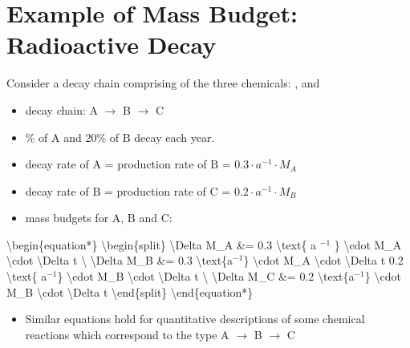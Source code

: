 \documentclass[letterpaper,10pt,english]{jupyterBook}
\begin{document}
\section{Example of Mass Budget: Radioactive Decay}
\label{\detokenize{content/background/03_basic_hydrogeology:example-of-mass-budget-radioactive-decay}}
\sphinxAtStartPar
Consider a decay chain comprising of the three chemicals: ,  and 
\begin{itemize}
\item {} 
\sphinxAtStartPar
decay chain: A \(\rightarrow\) B \(\rightarrow\) C       

\item {} 
\% of \(\text{A}\) and 20\% of \(\text{B}\)  decay each year.

\item {} 
\sphinxAtStartPar
decay rate of \(\text{A}\)   = production rate of \(\text{B}\)   = \(0.3 \cdot a^{-1}\cdot M_A\) 

\item {} 
\sphinxAtStartPar
decay rate of \(\text{B}\) = production rate of \(\text{C}\) = \(0.2\cdot a^{-1}\cdot M_B\) 

\item {} 
\sphinxAtStartPar
mass budgets for \(\text{A}\), \(\text{B}\) and \(\text{C}\):

\end{itemize}

\sphinxAtStartPar
\textbackslash{}begin\{equation*\}
\textbackslash{}begin\{split\}
\textbackslash{}Delta M\_A \&= 0.3 \textbackslash{}text\{ a \(^{-1}\) \} \textbackslash{}cdot M\_A  \textbackslash{}cdot \textbackslash{}Delta t  \textbackslash{}
\textbackslash{}Delta M\_B  \&= 0.3 \textbackslash{}text\{a\(^{-1}\)\} \textbackslash{}cdot M\_A  \textbackslash{}cdot \textbackslash{}Delta t \sphinxhyphen{} 0.2 \textbackslash{}text\{ a\(^{-1}\)\} \textbackslash{}cdot M\_B  \textbackslash{}cdot \textbackslash{}Delta t \textbackslash{}
\textbackslash{}Delta M\_C \&= 0.2 \textbackslash{}text\{a\(^{-1}\)\} \textbackslash{}cdot M\_B  \textbackslash{}cdot \textbackslash{}Delta t
\textbackslash{}end\{split\}
\textbackslash{}end\{equation*\}
\begin{itemize}
\item {} 
\sphinxAtStartPar
Similar equations hold for quantitative descriptions of some chemical reactions which correspond to the type A \(\rightarrow\) B \(\rightarrow\) C

\end{itemize}
\end{document}

